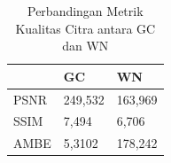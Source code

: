 \begin{table}[H]
	\centering
	\caption{Perbandingan Metrik Kualitas Citra antara GC dan WN}
	\label{tab:kualitas_gc_wn}
	\begin{tabular}{|l|l|l|}
		\hline
		& \textbf{GC} & \textbf{WN} \\ \hline
		PSNR & 249,532 & 163,969 \\ \hline
		SSIM & 7,494 & 6,706 \\ \hline
		AMBE & 5,3102 & 178,242 \\ \hline
	\end{tabular}
\end{table}
